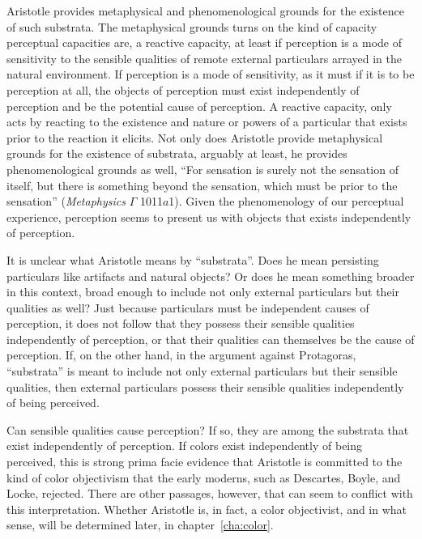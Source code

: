 Aristotle provides metaphysical and phenomenological grounds for the existence of such substrata. The metaphysical grounds turns on the kind of capacity perceptual capacities are, a reactive capacity, at least if perception is a mode of sensitivity to the sensible qualities of remote external particulars arrayed in the natural environment. If perception is a mode of sensitivity, as it must if it is to be perception at all, the objects of perception must exist independently of perception and be the potential cause of perception. A reactive capacity, only acts by reacting to the existence and nature or powers of a particular that exists prior to the reaction it elicits. Not only does Aristotle provide metaphysical grounds for the existence of substrata, arguably at least, he provides phenomenological grounds as well, ``For sensation is surely not the sensation of itself, but there is something beyond the sensation, which must be prior to the sensation'' (\emph{Metaphysics} \( \Gamma \) 1011\( a \)1). Given the phenomenology of our perceptual experience, perception seems to present us with objects that exists independently of perception.

It is unclear what Aristotle means by ``substrata''. Does he mean persisting particulars like artifacts and natural objects? Or does he mean something broader in this context, broad enough to include not only external particulars but their qualities as well? Just because particulars must be independent causes of perception, it does not follow that they possess their sensible qualities independently of perception, or that their qualities can themselves be the cause of perception. If, on the other hand, in the argument against Protagoras, ``substrata'' is meant to include not only external particulars but their sensible qualities, then external particulars possess their sensible qualities independently of being perceived. 

Can sensible qualities cause perception? If so, they are among the substrata that exist independently of perception. If colors exist independently of being perceived, this is strong prima facie evidence that Aristotle is committed to the kind of color objectivism that the early moderns, such as Descartes, Boyle, and Locke, rejected. There are other passages, however, that can seem to conflict with this interpretation. Whether Aristotle is, in fact, a color objectivist, and in what sense, will be determined later, in chapter~\ref{cha:color}.

